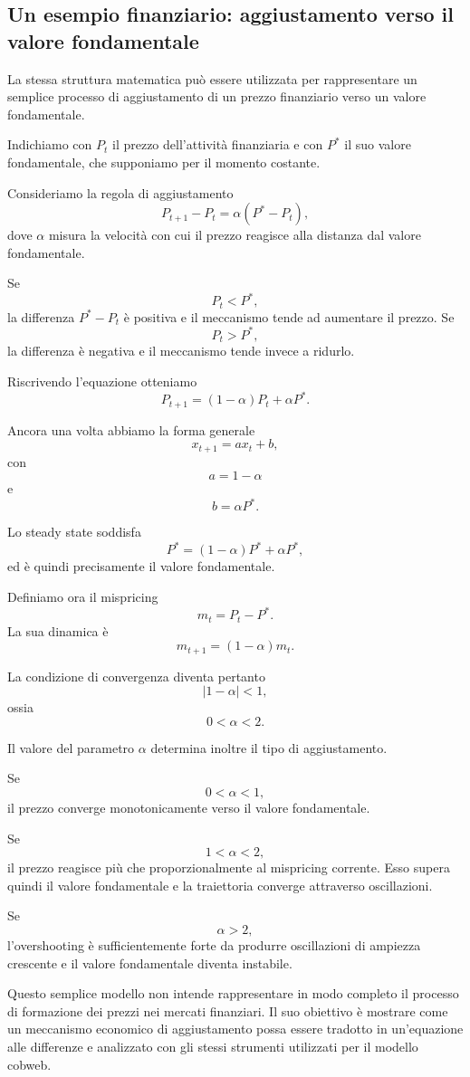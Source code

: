 \documentclass{book}
\begin{document}
\subsection{Un esempio finanziario: aggiustamento verso il valore fondamentale}

La stessa struttura matematica può essere utilizzata per rappresentare
un semplice processo di aggiustamento di un prezzo finanziario verso
un valore fondamentale.

Indichiamo con $P_t$ il prezzo dell'attività finanziaria e con $P^*$
il suo valore fondamentale, che supponiamo per il momento costante.

Consideriamo la regola di aggiustamento
\[
P_{t+1}-P_t
=
\alpha(P^*-P_t),
\]
dove $\alpha$ misura la velocità con cui il prezzo reagisce alla
distanza dal valore fondamentale.

Se
\[
P_t<P^*,
\]
la differenza $P^*-P_t$ è positiva e il meccanismo tende ad aumentare
il prezzo. Se
\[
P_t>P^*,
\]
la differenza è negativa e il meccanismo tende invece a ridurlo.

Riscrivendo l'equazione otteniamo
\[
P_{t+1}
=
(1-\alpha)P_t+\alpha P^*.
\]

Ancora una volta abbiamo la forma generale
\[
x_{t+1}=ax_t+b,
\]
con
\[
a=1-\alpha
\]
e
\[
b=\alpha P^*.
\]

Lo steady state soddisfa
\[
P^*
=
(1-\alpha)P^*+\alpha P^*,
\]
ed è quindi precisamente il valore fondamentale.

Definiamo ora il mispricing
\[
m_t=P_t-P^*.
\]
La sua dinamica è
\[
m_{t+1}
=
(1-\alpha)m_t.
\]

La condizione di convergenza diventa pertanto
\[
|1-\alpha|<1,
\]
ossia
\[
0<\alpha<2.
\]

Il valore del parametro $\alpha$ determina inoltre il tipo di
aggiustamento.

Se
\[
0<\alpha<1,
\]
il prezzo converge monotonicamente verso il valore fondamentale.

Se
\[
1<\alpha<2,
\]
il prezzo reagisce più che proporzionalmente al mispricing corrente.
Esso supera quindi il valore fondamentale e la traiettoria converge
attraverso oscillazioni.

Se
\[
\alpha>2,
\]
l'overshooting è sufficientemente forte da produrre oscillazioni di
ampiezza crescente e il valore fondamentale diventa instabile.

Questo semplice modello non intende rappresentare in modo completo il
processo di formazione dei prezzi nei mercati finanziari. Il suo
obiettivo è mostrare come un meccanismo economico di aggiustamento possa
essere tradotto in un'equazione alle differenze e analizzato con gli
stessi strumenti utilizzati per il modello cobweb.
\end{document}

